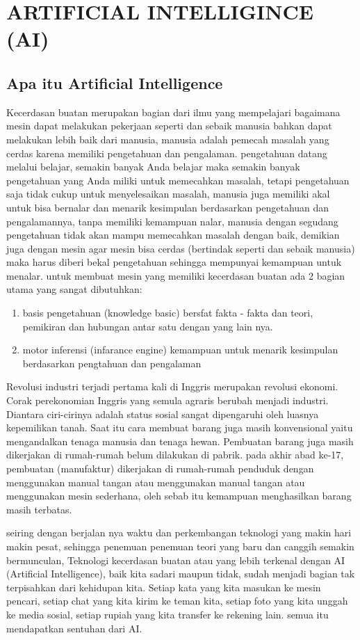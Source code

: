 \chapter{ARTIFICIAL INTELLIGINCE (AI)}

\section{Apa itu Artificial Intelligence}
Kecerdasan buatan merupakan bagian dari ilmu yang mempelajari bagaimana mesin dapat melakukan pekerjaan seperti dan sebaik manusia bahkan dapat melakukan lebih baik dari manusia, manusia adalah pemecah masalah yang cerdas karena memiliki pengetahuan dan pengalaman. pengetahuan datang melalui belajar, semakin banyak Anda belajar maka semakin banyak pengetahuan yang Anda miliki untuk memecahkan masalah, tetapi pengetahuan saja tidak cukup untuk menyelesaikan masalah, manusia juga memiliki akal untuk bisa bernalar dan menarik kesimpulan berdasarkan pengetahuan dan pengalamannya, tanpa memiliki kemampuan nalar, manusia dengan segudang pengetahuan tidak akan mampu memecahkan masalah dengan baik, demikian juga dengan mesin agar mesin bisa cerdas (bertindak seperti dan sebaik manusia) maka harus diberi bekal pengetahuan sehingga mempunyai kemampuan untuk menalar. untuk membuat mesin yang memiliki kecerdasan buatan ada 2 bagian utama yang sangat dibutuhkan:
\begin{enumerate}
  \item basis pengetahuan (knowledge basic) bersfat fakta - fakta dan teori, pemikiran dan hubungan antar satu dengan yang lain nya.
  \item motor inferensi (infarance engine) kemampuan untuk menarik kesimpulan berdasarkan pengtahuan dan pengalaman
\end{enumerate} 
Revolusi industri terjadi pertama kali di Inggris merupakan revolusi ekonomi. Corak perekonomian Inggris yang semula agraris berubah menjadi industri. Diantara ciri-cirinya adalah status sosial sangat dipengaruhi oleh luasnya kepemilikan tanah. Saat itu cara membuat barang juga masih konvensional yaitu mengandalkan tenaga manusia dan tenaga hewan. Pembuatan barang juga masih dikerjakan di rumah-rumah belum dilakukan di pabrik. pada akhir abad ke-17, pembuatan (manufaktur) dikerjakan di rumah-rumah penduduk dengan menggunakan manual tangan atau menggunakan manual tangan atau menggunakan mesin sederhana, oleh sebab itu kemampuan menghasilkan barang masih terbatas. 

seiring dengan berjalan nya waktu dan perkembangan teknologi yang makin hari makin pesat, sehingga penemuan penemuan teori yang baru dan canggih semakin bermunculan, Teknologi kecerdasan buatan atau yang lebih terkenal dengan AI (Artificial Intelligence), baik kita sadari maupun tidak, sudah menjadi bagian tak terpisahkan dari kehidupan kita. Setiap kata yang kita masukan ke mesin pencari, setiap chat yang kita kirim ke teman kita, setiap foto yang kita unggah ke media sosial, setiap rupiah yang kita transfer ke rekening lain. semua itu mendapatkan sentuhan dari AI.

